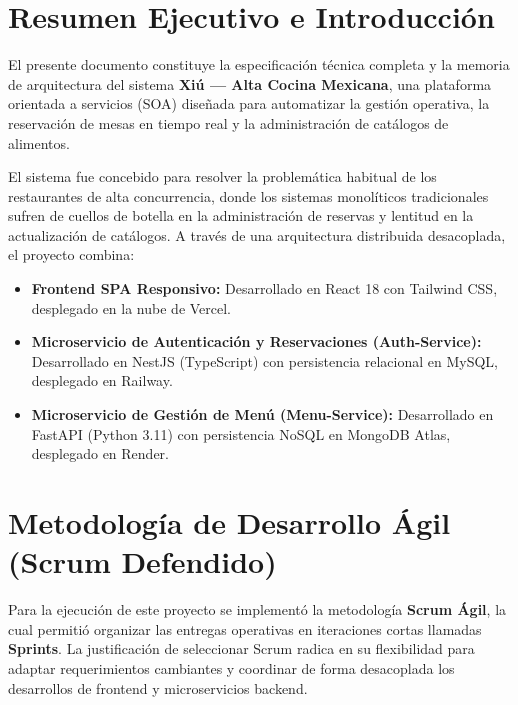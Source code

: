 \documentclass[12pt,a4paper]{article}
\begin{document}
\newpage
{}
\tableofcontents
\newpage
\listoffigures
\listoftables
\newpage
{}

\section{Resumen Ejecutivo e Introducción}
El presente documento constituye la especificación técnica completa y la memoria de arquitectura del sistema \textbf{Xiú --- Alta Cocina Mexicana}, una plataforma orientada a servicios (SOA) diseñada para automatizar la gestión operativa, la reservación de mesas en tiempo real y la administración de catálogos de alimentos.

El sistema fue concebido para resolver la problemática habitual de los restaurantes de alta concurrencia, donde los sistemas monolíticos tradicionales sufren de cuellos de botella en la administración de reservas y lentitud en la actualización de catálogos. A través de una arquitectura distribuida desacoplada, el proyecto combina:
\begin{itemize}[leftmargin=*]
  \item \textbf{Frontend SPA Responsivo:} Desarrollado en React 18 con Tailwind CSS, desplegado en la nube de Vercel.
  \item \textbf{Microservicio de Autenticación y Reservaciones (Auth-Service):} Desarrollado en NestJS (TypeScript) con persistencia relacional en MySQL, desplegado en Railway.
  \item \textbf{Microservicio de Gestión de Menú (Menu-Service):} Desarrollado en FastAPI (Python 3.11) con persistencia NoSQL en MongoDB Atlas, desplegado en Render.
\end{itemize}

\section{Metodología de Desarrollo Ágil (Scrum Defendido)}
Para la ejecución de este proyecto se implementó la metodología \textbf{Scrum Ágil}, la cual permitió organizar las entregas operativas en iteraciones cortas llamadas \textbf{Sprints}. La justificación de seleccionar Scrum radica en su flexibilidad para adaptar requerimientos cambiantes y coordinar de forma desacoplada los desarrollos de frontend y microservicios backend.
\end{document}
